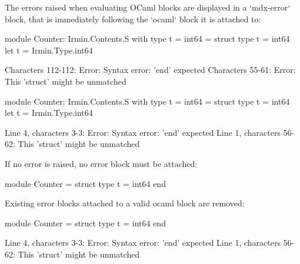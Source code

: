 The errors raised when evaluating OCaml blocks are displayed in a `mdx-error` block, that is immediately following the `ocaml` block it is attached to:


\begin{ocaml}
module Counter: Irmin.Contents.S with type t = int64 = struct
  type t = int64
  let t = Irmin.Type.int64
\end{ocaml}
\begin{mdx-error}
Characters 112-112:
Error: Syntax error: 'end' expected
Characters 55-61:
Error: This 'struct' might be unmatched
\end{mdx-error}


\begin{ocaml}
module Counter: Irmin.Contents.S with type t = int64 = struct
  type t = int64
  let t = Irmin.Type.int64
\end{ocaml}
\begin{mdx-error}
Line 4, characters 3-3:
Error: Syntax error: 'end' expected
Line 1, characters 56-62:
  This 'struct' might be unmatched
\end{mdx-error}


If no error is raised, no error block must be attached:

\begin{ocaml}
module Counter = struct
  type t = int64
end
\end{ocaml}

Existing error blocks attached to a valid ocaml block are removed:

\begin{ocaml}
module Counter = struct
  type t = int64
end
\end{ocaml}
\begin{mdx-error}
Line 4, characters 3-3:
Error: Syntax error: 'end' expected
Line 1, characters 56-62:
  This 'struct' might be unmatched
\end{mdx-error}
